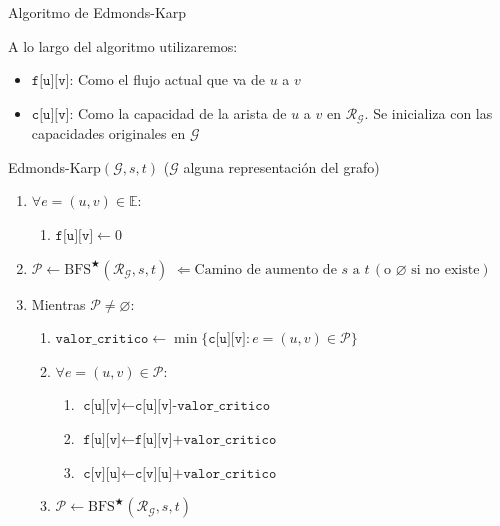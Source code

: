 \documentclass[8pt,xcolor={dvipsnames}]{beamer}
\begin{document}
\begin{frame}{Algoritmo de Edmonds-Karp}
	
	A lo largo del algoritmo utilizaremos:
	\begin{itemize}
		\item $\texttt{f[u][v]}$: Como el flujo actual que va de $u$ a $v$
		\item $\texttt{c[u][v]}$: Como la capacidad de la arista de $u$ a $v$ en $\mathcal{R}_{\mathcal{G}}$. Se inicializa con las capacidades originales en $\mathcal{G}$
	\end{itemize}
	Edmonds-Karp$(\mathcal{G},s,t)$ ($\mathcal{G}$ alguna representaci\'on del grafo)
	\begin{enumerate}
		\item $\forall e = (u,v) \in \mathbb{E}:$
		\begin{enumerate}
			\item $\texttt{f[u][v]} \leftarrow 0$
		\end{enumerate}
		\item $\mathcal{P} \leftarrow \text{BFS}^{\bigstar}(\mathcal{R}_{\mathcal{G}},s,t)$ \textcolor{Mahogany}{\scriptsize $\Leftarrow  \boxed{\text{Camino de aumento de } s \text{ a } t\hspace{2pt} (\text{o }\varnothing\text{ si no existe})}$}
		\item Mientras $\mathcal{P} \neq \varnothing$:
		\begin{enumerate}
			\item $\texttt{valor\_critico} \leftarrow \min \{ \texttt{c[u][v]} : e = (u,v) \in \mathcal{P} \}$
			\item $\forall e =(u,v) \in \mathcal{P}$:
			\begin{enumerate}
				\item $\texttt{c[u][v]} \leftarrow \texttt{c[u][v]-valor\_critico}$
				\item $\texttt{f[u][v]} \leftarrow \texttt{f[u][v]+valor\_critico}$
				\item $\texttt{c[v][u]} \leftarrow \texttt{c[v][u]+valor\_critico}$ 
			\end{enumerate}
			\item $\mathcal{P} \leftarrow \text{BFS}^{\bigstar}(\mathcal{R}_{\mathcal{G}},s,t)$
		\end{enumerate}
	\end{enumerate}
\end{frame}
\end{document}

